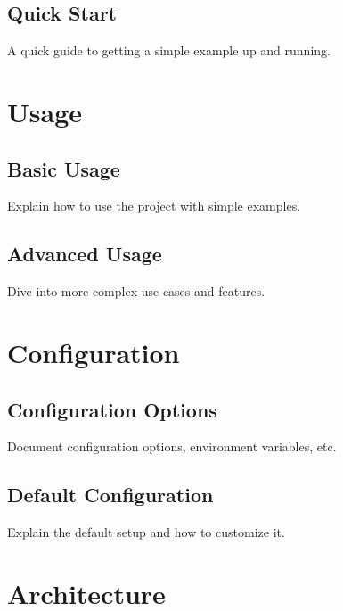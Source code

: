 \documentclass[letterpaper,10pt,english]{sphinxmanual}
\begin{document}
\section{Quick Start}
\label{\detokenize{getting_started:quick-start}}
\sphinxAtStartPar
A quick guide to getting a simple example up and running.

\sphinxstepscope


\chapter{Usage}
\label{\detokenize{usage:usage}}\label{\detokenize{usage::doc}}

\section{Basic Usage}
\label{\detokenize{usage:basic-usage}}
\sphinxAtStartPar
Explain how to use the project with simple examples.


\section{Advanced Usage}
\label{\detokenize{usage:advanced-usage}}
\sphinxAtStartPar
Dive into more complex use cases and features.

\sphinxstepscope


\chapter{Configuration}
\label{\detokenize{configuration:configuration}}\label{\detokenize{configuration::doc}}

\section{Configuration Options}
\label{\detokenize{configuration:configuration-options}}
\sphinxAtStartPar
Document configuration options, environment variables, etc.


\section{Default Configuration}
\label{\detokenize{configuration:default-configuration}}
\sphinxAtStartPar
Explain the default setup and how to customize it.

\sphinxstepscope


\chapter{Architecture}
\label{\detokenize{architecture:architecture}}\label{\detokenize{architecture::doc}}
\end{document}
